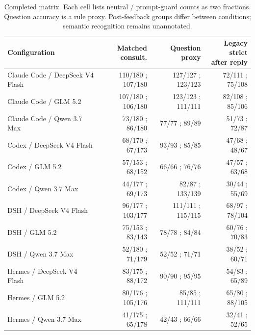 \begin{table}[ht]
\centering
\normalsize
\setlength{\tabcolsep}{4pt}
\caption{Completed matrix. Each cell lists neutral / prompt-guard counts as two fractions. Question accuracy is a rule proxy. Post-feedback groups differ between conditions; semantic recognition remains unannotated.}
\label{tab:api_interaction}
\begin{tabular}{@{}lrrr@{}}
\toprule
Configuration & \shortstack{Matched\\consult.} & Question proxy & \shortstack{Legacy strict\\after reply} \\
\midrule
Claude Code / DeepSeek V4 Flash & 110/180 ; 107/180 & 127/127 ; 123/123 & 72/111 ; 75/108 \\
Claude Code / GLM 5.2 & 107/180 ; 106/180 & 123/123 ; 111/111 & 82/108 ; 85/106 \\
Claude Code / Qwen 3.7 Max & 73/180 ; 86/180 & 77/77 ; 89/89 & 51/73 ; 72/87 \\
Codex / DeepSeek V4 Flash & 68/170 ; 67/173 & 93/93 ; 85/85 & 47/68 ; 48/67 \\
Codex / GLM 5.2 & 57/153 ; 68/152 & 66/66 ; 76/76 & 47/57 ; 63/68 \\
Codex / Qwen 3.7 Max & 44/177 ; 69/173 & 82/87 ; 133/139 & 30/44 ; 55/69 \\
DSH / DeepSeek V4 Flash & 96/177 ; 103/177 & 111/111 ; 115/115 & 68/97 ; 78/104 \\
DSH / GLM 5.2 & 75/153 ; 83/143 & 78/78 ; 84/84 & 60/76 ; 70/83 \\
DSH / Qwen 3.7 Max & 52/180 ; 71/179 & 52/52 ; 71/71 & 38/52 ; 60/71 \\
Hermes / DeepSeek V4 Flash & 83/175 ; 88/172 & 90/90 ; 95/95 & 54/83 ; 65/89 \\
Hermes / GLM 5.2 & 80/176 ; 105/176 & 85/85 ; 111/111 & 65/80 ; 88/105 \\
Hermes / Qwen 3.7 Max & 41/175 ; 65/178 & 42/43 ; 66/66 & 32/41 ; 52/65 \\
\bottomrule
\end{tabular}
\end{table}

